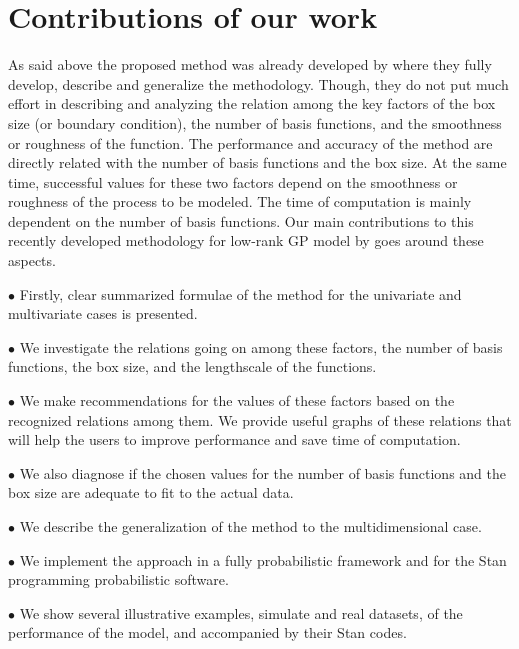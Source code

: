 \documentclass[]{interact}
\theoremstyle{plain}%
\theoremstyle{definition}
\theoremstyle{remark}
\begin{document}
\section{Contributions of our work}

As said above the proposed method was already developed by \cite{solin2018hilbert} where they fully develop, describe and generalize the methodology. Though, they do not put much effort in describing and analyzing the relation among the key factors of the box size (or boundary condition), the number of basis functions, and the smoothness or roughness of the function. The performance and accuracy of the method are directly related with the number of basis functions and the box size. At the same time, successful values for these two factors depend on the smoothness or roughness of the process to be modeled. The time of computation is mainly dependent on the number of basis functions. Our main contributions to this recently developed methodology for low-rank GP model by \cite{solin2018hilbert} goes around these aspects.

\vspace{2mm}
$\bullet$ Firstly, clear summarized formulae of the method for the univariate and multivariate cases is presented. 

\vspace{2mm}
$\bullet$ We investigate the relations going on among these factors, the number of basis functions, the box size, and the lengthscale of the functions.

\vspace{2mm}
$\bullet$ We make recommendations for the values of these factors based on the recognized relations among them. We provide useful graphs of these relations that will help the users to improve performance and save time of computation.

\vspace{2mm}
$\bullet$ We also diagnose if the chosen values for the number of basis functions and the box size are adequate to fit to the actual data.

\vspace{2mm}
$\bullet$ We describe the generalization of the method to the multidimensional case.

\vspace{2mm}
$\bullet$ We implement the approach in a fully probabilistic framework and for the Stan programming probabilistic software.

\vspace{2mm}
$\bullet$ We show several illustrative examples, simulate and real datasets, of the performance of the model, and accompanied by their Stan codes.
\end{document}
